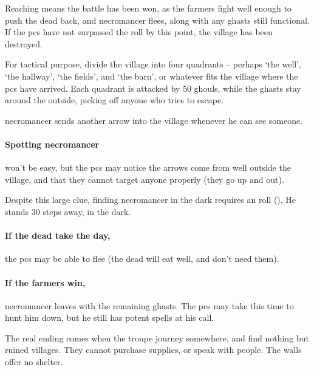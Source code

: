 Reaching \tn[16] means the battle has been won, as the farmers fight well enough to push the dead back, and \gls{necromancer} flees, along with any ghasts still functional.
If the \glspl{pc} have not surpassed the roll by this point, the \gls{village} has been destroyed.

For tactical purpose, divide the \gls{village} into four quadrants -- perhaps `the well', `the hallway', `the fields', and `the barn', or whatever fits the \gls{village} where the \glspl{pc} have arrived.
Each quadrant is attacked by 50 ghouls, while the ghasts stay around the outside, picking off anyone who tries to escape.

\Gls{necromancer} sends another arrow into the \gls{village} whenever he can see someone.

\paragraph{Spotting \gls{necromancer}}
won't be easy, but the \glspl{pc} may notice the arrows come from well outside the \gls{village}, and that they cannot target anyone properly (they go up and out).

Despite this large clue, finding \gls{necromancer} in the dark requires an  roll (\tn[12]).
He stands 30 \glspl{step} away, in the dark.

\paragraph{If the dead take the day,}
the \glspl{pc} may be able to flee (the dead will eat well, and don't need them).

\paragraph{If the farmers win,}
\gls{necromancer} leaves with the remaining ghasts.
The \glspl{pc} may take this time to hunt him down, but he still has potent spells at his call.

\thenecromancer

\showStdSpells[
  \deathStormSpell
]




\bigLine

The real ending comes when the troupe journey somewhere, and find nothing but ruined \glspl{village}.
They cannot purchase supplies, or speak with people.
The walls offer no shelter.
